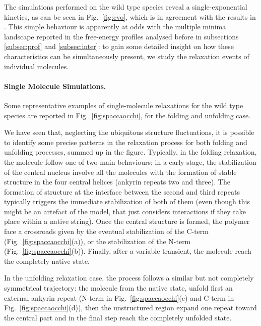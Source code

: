 The simulations performed on the wild type species reveal a single-exponential kinetics, as can
be seen in Fig.~\ref{fig:evo}, which is in agreement with the results in \cite{Lowe2007a}.
This simple behaviour is apparently at odds with the multiple minima landscape
reported in the free-energy profiles analysed before in subsections
\ref{subsec:prof} and \ref{subsec:inter}: to gain some detailed insight on how these
characteristics can be simultaneously present, we study the relaxation events of
individual molecules.

\paragraph{Single Molecule Simulations.}
Some representative examples of single-molecule relaxations for the wild type
species are reported in Fig.~\ref{fig:spaccaocchi}, for the folding and
unfolding case.

We have seen that, neglecting the ubiquitous structure fluctuations, it is
possible to identify some precise patterns in the relaxation process for both
folding and unfolding processes, summed up in the figure.
Typically, in the folding relaxation, the molecule follow one of two main
behaviours: in a early stage, the stabilization of the central nucleus involve
all the molecules with the formation of stable structure in the four central
helices (ankyrin repeats two and three). 
The formation of
structure at the interface between the second and third repeats typically
triggers the immediate stabilization of both of them (even though this might be
an artefact of the model, that just considers interactions if they take place
within a native string).
Once the central structure is formed, the
polymer face a crossroads given by the eventual stabilization of the C-term
(Fig.~\ref{fig:spaccaocchi}(a)), or the stabilization of the N-term
(Fig.~\ref{fig:spaccaocchi}(b)).
Finally, after a variable transient, the molecule reach the completely native
state.

In the unfolding relaxation case, the process follows a similar but not
completely symmetrical trajectory: the molecule from the native state, unfold first an
external ankyrin repeat (N-term in Fig.~\ref{fig:spaccaocchi}(c) and C-term in
Fig.~\ref{fig:spaccaocchi}(d)), then the unstructured region expand one repeat
toward the central part and in the final step reach the completely unfolded state.

